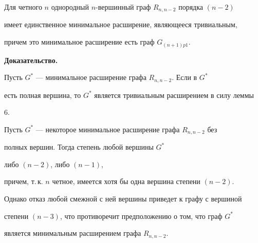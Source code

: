 \begin{lem}


Для четного $n$ однородный $n$-вершинный граф $R_{n,n-2}$ порядка $(n-2)$


имеет единственное минимальное расширение, являющееся тривиальным,


причем это минимальное расширение есть граф $G_{(n+1)p1}$.


\end{lem}





{\bf Доказательство.}


Пусть $G^*$ --- минимальное расширение графа $R_{n,n-2}$. Если в $G^*$


есть полная вершина, то $G^*$ является тривиальным расширением в силу леммы


6.





Пусть $G^*$ --- некоторое минимальное расширение графа $R_{n,n-2}$ без


полных вершин. Тогда степень любой вершины $G^*$


либо $(n-2)$, либо $(n-1)$,


причем, т.\,к. $n$ четное, имеется хотя бы одна вершина степени $(n-2)$.


Однако отказ любой смежной с ней вершины приведет к графу с вершиной


степени $(n-3)$, что противоречит предположению о том, что граф $G^*$


является минимальным расширением графа $R_{n,n-2}$.





